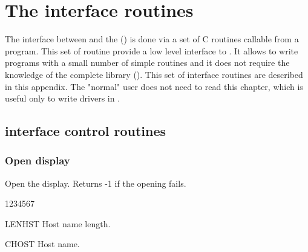 
\chapter{The \XW{} interface routines}

The interface between \HIGZ{} and the \XW{} () is done via a set of C
routines callable from a \FORTRAN{} program. This set of routine provide a low
level interface to . It allows to write  programs with a small number
of simple routines and it does not require the knowledge of the complete 
library (\XLIB). This set of interface routines are described in this appendix.
The "normal" \HIGZ{} user does not need to read this chapter, which is useful
only to write  drivers in \FORTRAN.

\section{ interface control routines}
\subsection{Open  display}
\Action
Open the display. Returns -1 if the opening fails.
\Pdesc
\begin{DLtt}{1234567}
\item[LENHST] Host name length.
\item[CHOST] Host name.
\end{DLtt}
